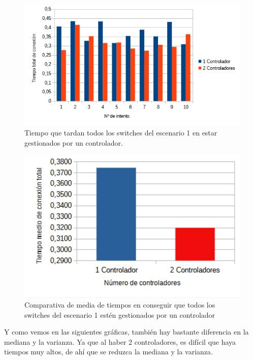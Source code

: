 \documentclass[a4paper, 12pt]{book}
\begin{document}
 	\begin{figure}[H]
 		\centering
 		\includegraphics[width=16cm, keepaspectratio]{img/comparativabucle4}
 		\caption{Tiempo que tardan todos los switches del escenario 1 en estar gestionados por un controlador.}
 		\label{figura:comparativabucle4}
 	\end{figure}
 	
 	\begin{figure}[H]
 		\centering
 		\includegraphics[width=12cm, keepaspectratio]{img/comparativamediasbucle}
 		\caption{Comparativa de media de tiempos en conseguir que todos los switches del escenario 1 estén gestionados por un controlador}
 		\label{figura:mediabucle4}
 	\end{figure}
 	
 	
 	Y como vemos en las siguientes gráficas, también hay bastante diferencia en la mediana y la varianza. Ya que al haber 2 controladores, es difícil que haya tiempos muy altos, de ahí que se reduzca la mediana y la varianza.
 	
\end{document}
